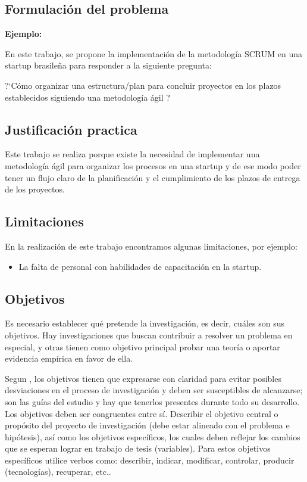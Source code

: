 \subsection{Formulación del problema}
{\bf Ejemplo:}\par

  En este trabajo, se propone la implementación de la metodología SCRUM  en una startup brasileña para responder a la siguiente pregunta:
 \begin{center} 
     ?`Cómo organizar una estructura/plan para concluir proyectos en los plazos establecidos siguiendo una metodología ágil ?
 \end{center}


\subsection{Justificación practica}

Este trabajo se realiza porque existe la necesidad de implementar una metodología ágil para organizar los procesos en una startup y de ese modo poder tener un flujo claro de la planificación y el cumplimiento de los plazos de entrega de los proyectos.


\subsection{Limitaciones}
En la realización de este trabajo encontramos algunas limitaciones, por ejemplo:

\begin{itemize} 
	\item La falta de personal con habilidades de capacitación en la startup.
\end{itemize} 


\subsection{Objetivos}
Es necesario establecer
 qué pretende la investigación, es decir, cuáles son sus objetivos. Hay investigaciones que buscan contribuir a resolver un problema en especial, y otras tienen como objetivo principal probar una teoría o aportar evidencia empírica en favor de ella. \par 
\vskip 0.3cm
Segun \cite{Rojas}, los objetivos tienen que expresarse con claridad para evitar posibles desviaciones en el proceso de investigación y deben ser susceptibles de alcanzarse; son las guías del estudio y hay que tenerlos presentes durante todo su desarrollo. Los objetivos deben ser congruentes entre sí.
\vskip 0.3cm
Describir el objetivo central o propósito del proyecto de investigación (debe estar alineado con el problema e hipótesis), así como los objetivos específicos, los cuales deben reflejar los cambios que se esperan lograr en trabajo de tesis (variables). Para estos objetivos específicos utilice verbos como: describir, indicar, modificar, controlar, producir (tecnologías), recuperar, etc..

